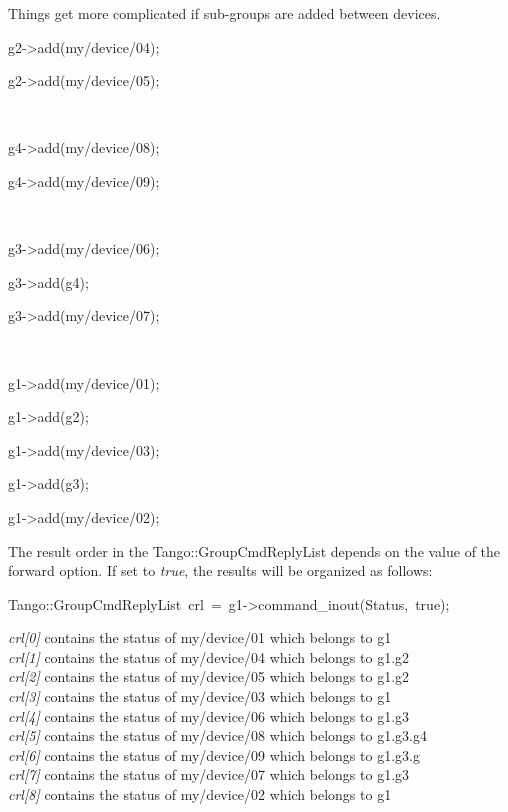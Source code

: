 Things get more complicated if sub-groups are added \textquotedbl{}between\textquotedbl{}
devices.
\begin{lyxcode}
g2->add(\textquotedbl{}my/device/04\textquotedbl{});

g2->add(\textquotedbl{}my/device/05\textquotedbl{});

~



g4->add(\textquotedbl{}my/device/08\textquotedbl{});

g4->add(\textquotedbl{}my/device/09\textquotedbl{});

~



g3->add(\textquotedbl{}my/device/06\textquotedbl{});

g3->add(g4);

g3->add(\textquotedbl{}my/device/07\textquotedbl{});

~



g1->add(\textquotedbl{}my/device/01\textquotedbl{});

g1->add(g2);

g1->add(\textquotedbl{}my/device/03\textquotedbl{});

g1->add(g3);

g1->add(\textquotedbl{}my/device/02\textquotedbl{});
\end{lyxcode}
The result order in the Tango::GroupCmdReplyList depends on the value
of the forward option. If set to \emph{true}, the
results will be organized as follows:
\begin{lyxcode}
Tango::GroupCmdReplyList~crl~=~g1->command\_inout(\textquotedbl{}Status\textquotedbl{},~true);
\end{lyxcode}
\emph{crl{[}0{]}} contains the status of my/device/01 which belongs
to g1\\
\emph{crl{[}1{]}} contains the status of my/device/04 which belongs
to g1.g2\\
\emph{crl{[}2{]}} contains the status of my/device/05 which belongs
to g1.g2\\
\emph{crl{[}3{]}} contains the status of my/device/03 which belongs
to g1\\
\emph{crl{[}4{]}} contains the status of my/device/06 which belongs
to g1.g3\\
\emph{crl{[}5{]}} contains the status of my/device/08 which belongs
to g1.g3.g4\\
\emph{crl{[}6{]}} contains the status of my/device/09 which belongs
to g1.g3.g \\
\emph{crl{[}7{]}} contains the status of my/device/07 which belongs
to g1.g3\\
\emph{crl{[}8{]}} contains the status of my/device/02 which belongs
to g1 

